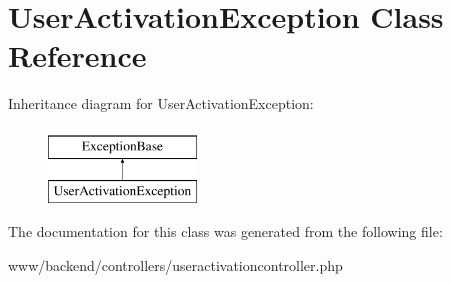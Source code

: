 \hypertarget{classUserActivationException}{
\section{UserActivationException Class Reference}
\label{classUserActivationException}
}
Inheritance diagram for UserActivationException:\begin{figure}[H]
\begin{center}
\leavevmode
\includegraphics[height=2.000000cm]{classUserActivationException}
\end{center}
\end{figure}


The documentation for this class was generated from the following file:\begin{DoxyCompactItemize}
\item 
www/backend/controllers/useractivationcontroller.php\end{DoxyCompactItemize}
